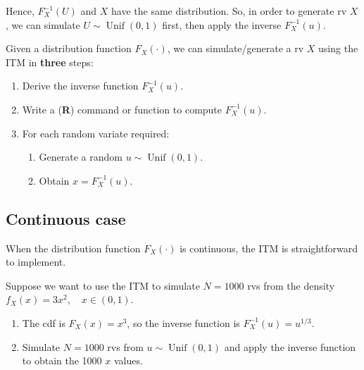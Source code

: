 \documentclass[
  letterpaper,
  DIV=11,
  numbers=noendperiod]{scrreprt}
\providecommand{\tightlist}{%
  \setlength{\itemsep}{0pt}\setlength{\parskip}{0pt}}
\begin{document}
Hence, \(F_X^{-1}(U)\) and \(X\) have the same distribution. So, in
order to generate rv \(X\), we can simulate
\(U\sim \operatorname{Unif}(0,1)\) first, then apply the inverse
\(F_X^{-1}(u)\).

\begin{tcolorbox}[enhanced jigsaw, bottomrule=.15mm, colframe=quarto-callout-note-color-frame, left=2mm, colbacktitle=quarto-callout-note-color!10!white, opacityback=0, rightrule=.15mm, bottomtitle=1mm, toptitle=1mm, coltitle=black, title=\textcolor{quarto-callout-note-color}{\faInfo}\hspace{0.5em}{Procedure with inverse transformation method}, titlerule=0mm, arc=.35mm, leftrule=.75mm, toprule=.15mm, opacitybacktitle=0.6, colback=white, breakable]

Given a distribution function \(F_X(\cdot)\), we can simulate/generate a
rv \(X\) using the ITM in \textbf{three} steps:

\begin{enumerate}
\def\labelenumi{\arabic{enumi}.}
\item
  Derive the inverse function \(F_X^{-1}(u)\).
\item
  Write a (\textbf{R}) command or function to compute \(F_X^{-1}(u)\).
\item
  For each random variate required:

  \begin{enumerate}
  \def\labelenumii{\roman{enumii})}
  \tightlist
  \item
    Generate a random \(u\sim \operatorname{Unif}(0,1)\).
  \item
    Obtain \(x = F_X^{-1}(u)\).
  \end{enumerate}
\end{enumerate}

\end{tcolorbox}

\subsection{Continuous case}\label{continuous-case}

When the distribution function \(F_X(\cdot)\) is continuous, the ITM is
straightforward to implement.

Suppose we want to use the ITM to simulate \(N=1000\) rvs from the
density \(f_X(x)=3x^2,\quad x\in(0,1)\).

\begin{enumerate}
\def\labelenumi{\arabic{enumi}.}
\item
  The cdf is \(F_X(x)=x^3\), so the inverse function is
  \(F_X^{-1}(u)=u^{1/3}\).
\item
  Simulate \(N=1000\) rvs from \(u\sim\operatorname{Unif}(0,1)\) and
  apply the inverse function to obtain the 1000 \(x\) values.
\end{enumerate}
\end{document}
